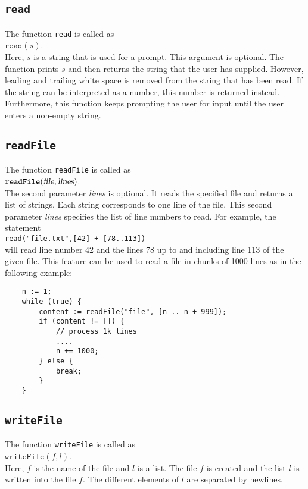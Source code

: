 \subsection{\texttt{read}}
The function \texttt{read}  is called as
\\[0.2cm]
\hspace*{1.3cm}
$\mathtt{read}(s)$.
\\[0.2cm]
Here, $s$ is a string that is used for a prompt.  This argument is optional. The function
prints $s$ and then 
returns the string that the user has supplied.  However, leading and trailing white space 
is removed from the string that has been read.  If the string can be interpreted as a
number, this number is returned instead.  Furthermore, this function keeps prompting the
user for input until the user enters a non-empty string.

\subsection{\texttt{readFile}}
The function \texttt{readFile}  is called as
\\[0.2cm]
\hspace*{1.3cm}
$\mathtt{readFile}(\textsl{file}, \textsl{lines})$.
\\[0.2cm]
The second parameter \textsl{lines} is optional.
It reads the specified file and returns a list of strings.  Each string corresponds to one
line of the file.   This second parameter \textsl{lines} specifies the list of line
numbers to read.  For example,  the statement 
\\[0.2cm]
\hspace*{1.3cm}
\texttt{read("file.txt",[42] + [78..113])}
\\[0.2cm]
will read line number 42 and the lines 78 up to and including line 113 of the given file.
This feature can be used to read a file in chunks of 1000 lines as in the following example:
\begin{verbatim}
    n := 1;
    while (true) {
        content := readFile("file", [n .. n + 999]);
        if (content != []) {
            // process 1k lines
            ....
            n += 1000;
        } else {
            break;
        }
    }
\end{verbatim}

\subsection{\texttt{writeFile}}
The function \texttt{writeFile}  is called as
\\[0.2cm]
\hspace*{1.3cm}
$\mathtt{writeFile}(f, l)$.
\\[0.2cm]
Here, $f$ is the name of the file and $l$ is a list.  The file $f$ is created and the list
$l$ is written into the file $f$.  The different elements of $l$ are separated by newlines.


